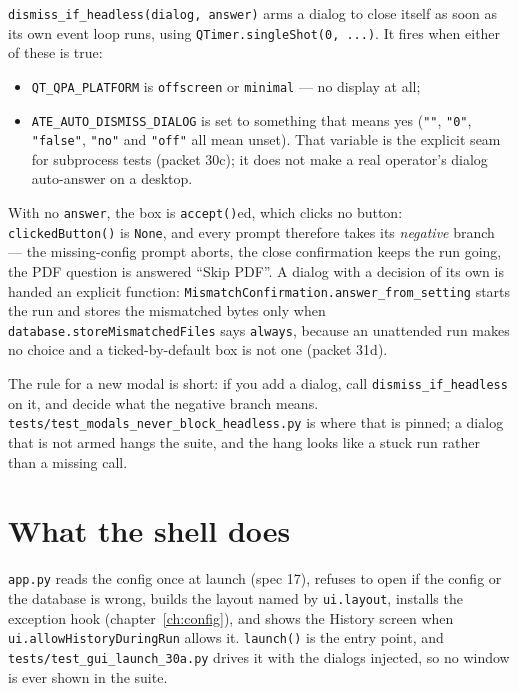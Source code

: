 \texttt{dismiss\_\allowbreak{}if\_\allowbreak{}headless(dialog, answer)} arms a dialog to close itself as soon as its own event
loop runs, using \texttt{QTimer.singleShot(0, ...)}. It fires when either of these is true:

\begin{itemize}
  \item \texttt{QT\_QPA\_PLATFORM} is \texttt{offscreen} or \texttt{minimal} --- no display at all;
  \item \texttt{ATE\_\allowbreak{}AUTO\_\allowbreak{}DISMISS\_\allowbreak{}DIALOG} is set to something that means yes (\texttt{""}, \texttt{"0"},
    \texttt{"false"}, \texttt{"no"} and \texttt{"off"} all mean unset). That variable is the explicit
    seam for subprocess tests (packet 30c); it does not make a real operator's dialog auto-answer on a
    desktop.
\end{itemize}

With no \texttt{answer}, the box is \texttt{accept()}ed, which clicks no button:
\texttt{clickedButton()} is \texttt{None}, and every prompt therefore takes its \emph{negative} branch ---
the missing-config prompt aborts, the close confirmation keeps the run going, the PDF question is answered
``Skip PDF''. A dialog with a decision of its own is handed an explicit function:
\texttt{MismatchConfirmation.answer\_\allowbreak{}from\_\allowbreak{}setting} starts the run and stores the mismatched bytes only
when \texttt{database.storeMismatchedFiles} says \texttt{always}, because an unattended run makes no
choice and a ticked-by-default box is not one (packet 31d).

The rule for a new modal is short: if you add a dialog, call \texttt{dismiss\_\allowbreak{}if\_\allowbreak{}headless} on it, and
decide what the negative branch means. \texttt{tests/\allowbreak{}test\_\allowbreak{}modals\_\allowbreak{}never\_\allowbreak{}block\_\allowbreak{}headless.py} is where
that is pinned; a dialog that is not armed hangs the suite, and the hang looks like a stuck run rather
than a missing call.

\section{What the shell does}

\texttt{app.py} reads the config once at launch (spec 17), refuses to open if the config or the database
is wrong, builds the layout named by \texttt{ui.layout}, installs the exception hook
(chapter~\ref{ch:config}), and shows the History screen when \texttt{ui.allowHistoryDuringRun} allows
it. \texttt{launch()} is the entry point, and \texttt{tests/\allowbreak{}test\_\allowbreak{}gui\_\allowbreak{}launch\_\allowbreak30a.py} drives it with the
dialogs injected, so no window is ever shown in the suite.

